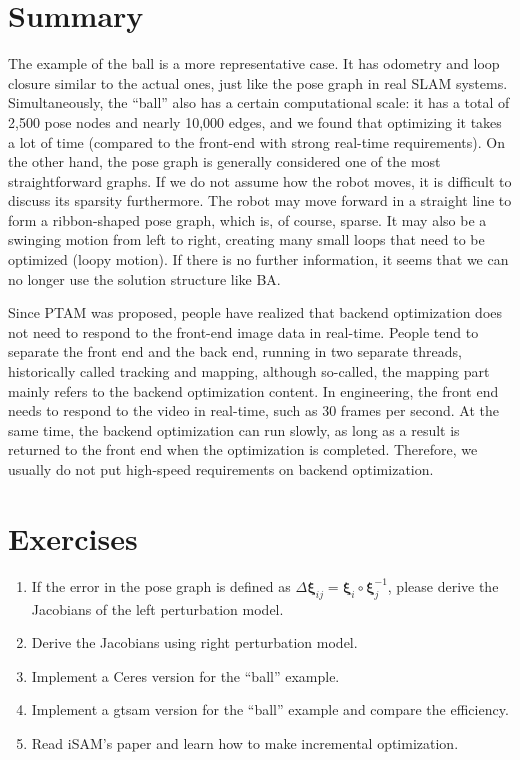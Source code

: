 \section{Summary}
The example of the ball is a more representative case. It has odometry and loop closure similar to the actual ones, just like the pose graph in real SLAM systems. Simultaneously, the ``ball'' also has a certain computational scale: it has a total of 2,500 pose nodes and nearly 10,000 edges, and we found that optimizing it takes a lot of time (compared to the front-end with strong real-time requirements). On the other hand, the pose graph is generally considered one of the most straightforward graphs. If we do not assume how the robot moves, it is difficult to discuss its sparsity furthermore. The robot may move forward in a straight line to form a ribbon-shaped pose graph, which is, of course, sparse. It may also be a swinging motion from left to right, creating many small loops that need to be optimized (loopy motion). If there is no further information, it seems that we can no longer use the solution structure like BA.

Since PTAM\textsuperscript{\cite{Klein2007}} was proposed, people have realized that backend optimization does not need to respond to the front-end image data in real-time. People tend to separate the front end and the back end, running in two separate threads, historically called tracking and mapping, although so-called, the mapping part mainly refers to the backend optimization content. In engineering, the front end needs to respond to the video in real-time, such as 30 frames per second. At the same time, the backend optimization can run slowly, as long as a result is returned to the front end when the optimization is completed. Therefore, we usually do not put high-speed requirements on backend optimization.

\section*{Exercises}
\begin{enumerate}
	\item If the error in the pose graph is defined as $\Delta \bm{\xi}_{ij} = \bm{\xi}_i \circ \bm{\xi}_j^{-1}$, please derive the Jacobians of the left perturbation model.
	\item Derive the Jacobians using right perturbation model. 
	\item Implement a Ceres version for the ``ball'' example. 
	\item Implement a gtsam version for the ``ball'' example and compare the efficiency. 
	\item[\optional] Read iSAM's paper \cite{Kaess2008,Kaess2011} and learn how to make incremental optimization. 
\end{enumerate}

